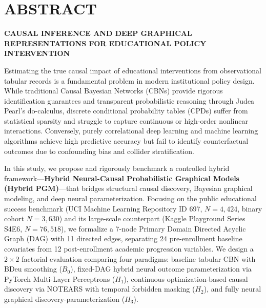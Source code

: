 \chapter*{ABSTRACT}

\begin{center}
    \textbf{\fontsize{13}{16}\selectfont CAUSAL INFERENCE AND DEEP GRAPHICAL REPRESENTATIONS FOR EDUCATIONAL POLICY INTERVENTION}
\end{center}
\vspace{0.3cm}

Estimating the true causal impact of educational interventions from observational tabular records is a fundamental problem in modern institutional policy design. While traditional Causal Bayesian Networks (CBNs) provide rigorous identification guarantees and transparent probabilistic reasoning through Judea Pearl's do-calculus, discrete conditional probability tables (CPDs) suffer from statistical sparsity and struggle to capture continuous or high-order nonlinear interactions. Conversely, purely correlational deep learning and machine learning algorithms achieve high predictive accuracy but fail to identify counterfactual outcomes due to confounding bias and collider stratification. 

In this study, we propose and rigorously benchmark a controlled hybrid framework—\textbf{Hybrid Neural-Causal Probabilistic Graphical Models (Hybrid PGM)}—that bridges structural causal discovery, Bayesian graphical modeling, and deep neural parameterization. Focusing on the public educational success benchmark (UCI Machine Learning Repository ID 697, $N=4,424$, binary cohort $N=3,630$) and its large-scale counterpart (Kaggle Playground Series S4E6, $N=76,518$), we formalize a 7-node Primary Domain Directed Acyclic Graph (DAG) with 11 directed edges, separating 24 pre-enrollment baseline covariates from 12 post-enrollment academic progression variables. We design a $2 \times 2$ factorial evaluation comparing four paradigms: baseline tabular CBN with BDeu smoothing ($B_0$), fixed-DAG hybrid neural outcome parameterization via PyTorch Multi-Layer Perceptrons ($H_1$), continuous optimization-based causal discovery via NOTEARS with temporal forbidden masking ($H_2$), and fully neural graphical discovery-parameterization ($H_3$).

